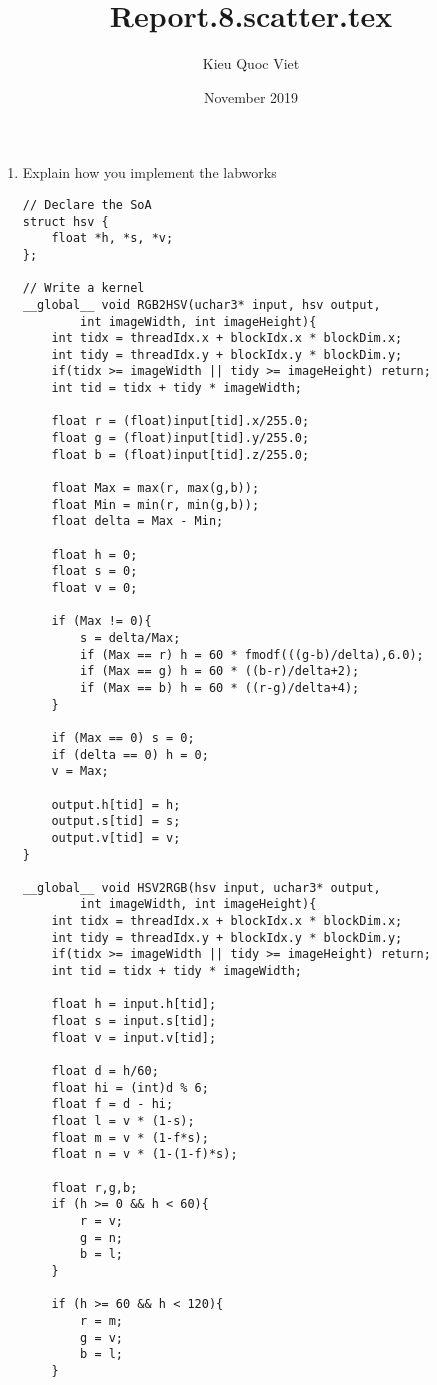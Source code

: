 \documentclass{article}
\title{Report.8.scatter.tex}
\author{Kieu Quoc Viet }
\date{November 2019}
\begin{document}
\maketitle

\begin{enumerate}
    \item Explain how you implement the labworks
    
    \begin{verbatim}
// Declare the SoA
struct hsv {
    float *h, *s, *v;
};

// Write a kernel
__global__ void RGB2HSV(uchar3* input, hsv output, 
        int imageWidth, int imageHeight){
    int tidx = threadIdx.x + blockIdx.x * blockDim.x;
    int tidy = threadIdx.y + blockIdx.y * blockDim.y;
    if(tidx >= imageWidth || tidy >= imageHeight) return;
    int tid = tidx + tidy * imageWidth;

    float r = (float)input[tid].x/255.0;
    float g = (float)input[tid].y/255.0;
    float b = (float)input[tid].z/255.0;

    float Max = max(r, max(g,b));
    float Min = min(r, min(g,b));
    float delta = Max - Min;

    float h = 0;
    float s = 0;
    float v = 0;

    if (Max != 0){
        s = delta/Max;
        if (Max == r) h = 60 * fmodf(((g-b)/delta),6.0);
        if (Max == g) h = 60 * ((b-r)/delta+2);
        if (Max == b) h = 60 * ((r-g)/delta+4);
    }

    if (Max == 0) s = 0;
    if (delta == 0) h = 0;
    v = Max;

    output.h[tid] = h;
    output.s[tid] = s;
    output.v[tid] = v;
}

__global__ void HSV2RGB(hsv input, uchar3* output, 
        int imageWidth, int imageHeight){
    int tidx = threadIdx.x + blockIdx.x * blockDim.x;
    int tidy = threadIdx.y + blockIdx.y * blockDim.y;
    if(tidx >= imageWidth || tidy >= imageHeight) return;
    int tid = tidx + tidy * imageWidth;
    
    float h = input.h[tid];
    float s = input.s[tid];
    float v = input.v[tid];

    float d = h/60;
    float hi = (int)d % 6;
    float f = d - hi;
    float l = v * (1-s);
    float m = v * (1-f*s);
    float n = v * (1-(1-f)*s);

    float r,g,b;
    if (h >= 0 && h < 60){
        r = v;
        g = n;
        b = l;
    }

    if (h >= 60 && h < 120){
        r = m;
        g = v;
        b = l;
    }


\end{verbatim}
\end{enumerate}
\end{document}
